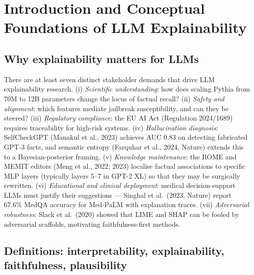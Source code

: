 \section{Introduction and Conceptual Foundations of LLM Explainability}\label{introduction-and-conceptual-foundations-of-llm-explainability}

\subsection{Why explainability matters for LLMs}\label{why-explainability-matters-for-llms}

There are at least seven distinct stakeholder demands that drive LLM explainability research. (i) \emph{Scientific understanding}: how does scaling Pythia from 70M to 12B parameters change the locus of factual recall? (ii) \emph{Safety and alignment}: which features mediate jailbreak susceptibility, and can they be steered? (iii) \emph{Regulatory compliance}: the EU AI Act (Regulation 2024/1689) requires traceability for high-risk systems. (iv) \emph{Hallucination diagnosis}: SelfCheckGPT (Manakul et al., 2023) achieves AUC 0.83 on detecting fabricated GPT-3 facts, and semantic entropy (Farquhar et al., 2024, Nature) extends this to a Bayesian-posterior framing. (v) \emph{Knowledge maintenance}: the ROME and MEMIT editors (Meng et al., 2022; 2023) localise factual associations to specific MLP layers (typically layers 5--7 in GPT-2 XL) so that they may be surgically rewritten. (vi) \emph{Educational and clinical deployment}: medical decision-support LLMs must justify their suggestions --- Singhal et al.~(2023, Nature) report 67.6\% MedQA accuracy for Med-PaLM with explanation traces. (vii) \emph{Adversarial robustness}: Slack et al.~(2020) showed that LIME and SHAP can be fooled by adversarial scaffolds, motivating faithfulness-first methods.

\subsection{Definitions: interpretability, explainability, faithfulness, plausibility}\label{definitions-interpretability-explainability-faithfulness-plausibility}

